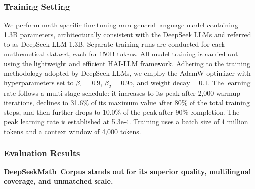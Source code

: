\begin{itemize}[topsep=0pt]
\subsubsection{Training Setting}
\label{sec:quality-policy}
We perform math-specific fine-tuning on a general language model containing 1.3B parameters, architecturally consistent with the DeepSeek LLMs \citep{deepseek-llm} and referred to as DeepSeek-LLM 1.3B. Separate training runs are conducted for each mathematical dataset, each for 150B tokens. All model training is carried out using the lightweight and efficient HAI-LLM \citep{haillm} framework. Adhering to the training methodology adopted by DeepSeek LLMs, we employ the AdamW optimizer \citep{adamW} with hyperparameters set to $\beta_1=0.9$, $\beta_2=0.95$, and $\mathrm{weight\_decay}=0.1$. The learning rate follows a multi-stage schedule: it increases to its peak after 2,000 warmup iterations, declines to 31.6\% of its maximum value after 80\% of the total training steps, and then further drops to 10.0\% of the peak after 90\% completion. The peak learning rate is established at 5.3e-4. Training uses a batch size of 4 million tokens and a context window of 4,000 tokens.

\subsubsection{Evaluation Results}

\textbf{DeepSeekMath~Corpus stands out for its superior quality, multilingual coverage, and unmatched scale.}


\end{itemize}
